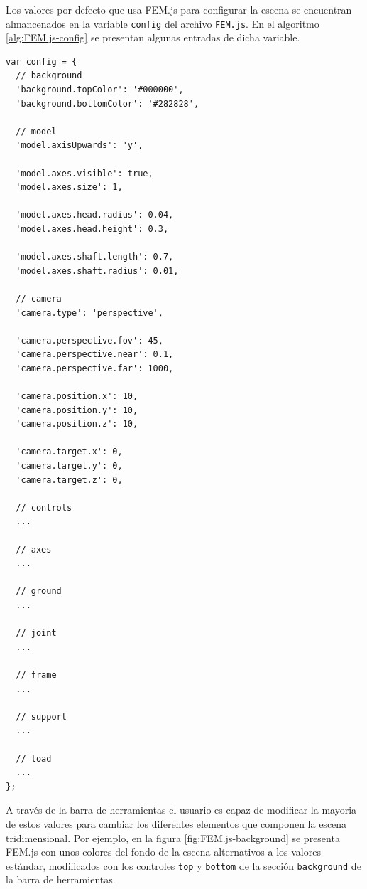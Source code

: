 Los valores por defecto que usa FEM.js para configurar la escena se encuentran almancenados en la variable \verb|config| del archivo \verb|FEM.js|. En el algoritmo \ref{alg:FEM.js-config} se presentan algunas entradas de dicha variable.\\

\begin{lstlisting}[language={},caption=Valores por defecto para configurar FEM.js.,label=alg:FEM.js-config,frame=single]
var config = {
  // background
  'background.topColor': '#000000',
  'background.bottomColor': '#282828',
  
  // model
  'model.axisUpwards': 'y',
  
  'model.axes.visible': true,
  'model.axes.size': 1,
  
  'model.axes.head.radius': 0.04,
  'model.axes.head.height': 0.3,
  
  'model.axes.shaft.length': 0.7, 
  'model.axes.shaft.radius': 0.01,
  
  // camera
  'camera.type': 'perspective',
  
  'camera.perspective.fov': 45,
  'camera.perspective.near': 0.1,
  'camera.perspective.far': 1000,
  
  'camera.position.x': 10,
  'camera.position.y': 10,
  'camera.position.z': 10,
  
  'camera.target.x': 0, 
  'camera.target.y': 0,
  'camera.target.z': 0,
  
  // controls
  ...
  
  // axes
  ...

  // ground
  ...
  
  // joint
  ...

  // frame
  ...
  
  // support
  ...
  
  // load
  ...
};  
\end{lstlisting}
\bigskip

A través de la barra de herramientas el usuario es capaz de modificar la mayoria de estos valores para cambiar los diferentes elementos que componen la escena tridimensional. Por ejemplo, en la figura \ref{fig:FEM.js-background} se presenta FEM.js con unos colores del fondo de la escena alternativos a los valores estándar, modificados con los controles \verb|top| y \verb|bottom| de la sección \verb|background| de la barra de herramientas.\\

